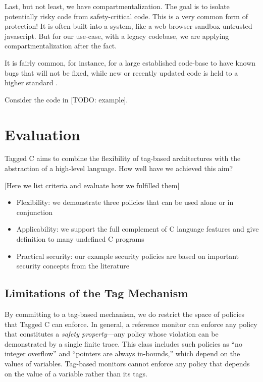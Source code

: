 \documentclass[acmsmall,review,anonymous]{acmart}\settopmatter{printfolios=true,printccs=false,printacmref=false}
\begin{document}
Last, but not least, we have compartmentalization.
The goal is to isolate potentially risky code from safety-critical code.
This is a very common form of protection! It is often built into a system, like
a web browser sandbox untrusted javascript. But for our use-case, with a legacy
codebase, we are applying compartmentalization after the fact.

It is fairly common, for instance, for a large established code-base to have known
bugs that will not be fixed, while new or recently updated code is held to a higher
standard \cite{Bessey10:Coverity}.

Consider the code in [TODO: example].

\section{Evaluation}
\label{sec:evaluation}

Tagged C aims to combine the flexibility of tag-based architectures with the abstraction
of a high-level language. How well have we achieved this aim?

[Here we list criteria and evaluate how we fulfilled them]

\begin{itemize}
\item Flexibility: we demonstrate three policies that can be used alone or in conjunction
\item Applicability: we support the full complement of C language features and give definition
  to many undefined C programs
\item Practical security: our example security policies are based on important security concepts
  from the literature
\end{itemize}

\subsection{Limitations of the Tag Mechanism}

By committing to a tag-based mechanism, we do restrict the space of policies that Tagged C
can enforce. In general, a reference monitor can enforce any policy that constitutes a
{\em safety property}---any policy whose violation can be demonstrated by a single finite
trace. This class includes such policies as ``no integer overflow'' and ``pointers are always in-bounds,''
which depend on the values of variables. Tag-based monitors cannot enforce any policy that
depends on the value of a variable rather than its tags.
\end{document}

